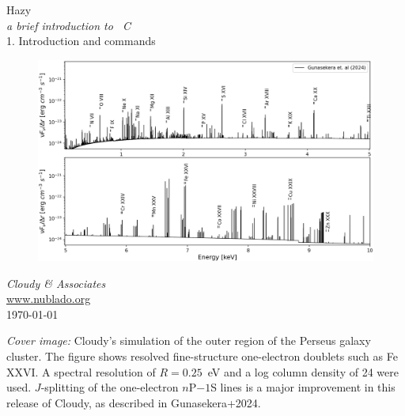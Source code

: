 \documentclass[12pt]{book}
\begin{document}
\frontmatter

\begin{titlepage}
\begin{center}

\Huge
Hazy\\
\Large
\emph{a brief introduction to \Cloudy\ C\VERSION}\\
\LARGE
1. Introduction and commands

\begin{figure}
\begin{center}
\hspace*{-1cm}
\includegraphics[clip=on,width=\columnwidth,height=0.6\textheight,keepaspectratio]{Gunasekera2024.png}
\end{center}
\end{figure}

\vspace{10 mm }
\LARGE
\emph{Cloudy \& Associates} \\
\Large
\href{http://www.nublado.org}{www.nublado.org} \\
\normalsize
\today
\end{center}
\end{titlepage}

\clearpage

\vspace{5mm}
\noindent
{\small
{\em Cover image:}
Cloudy's simulation of the outer region of the Perseus galaxy cluster. 
The figure shows resolved fine-structure one-electron doublets
such as Fe XXVI. 
A spectral resolution of $R=0.25$~eV and a log column density of 24 were used. $J$-splitting of the 
one-electron $n$P$-1$S lines is a major improvement in this
release of Cloudy, as described in Gunasekera+2024.
}
\clearpage
\end{document}
